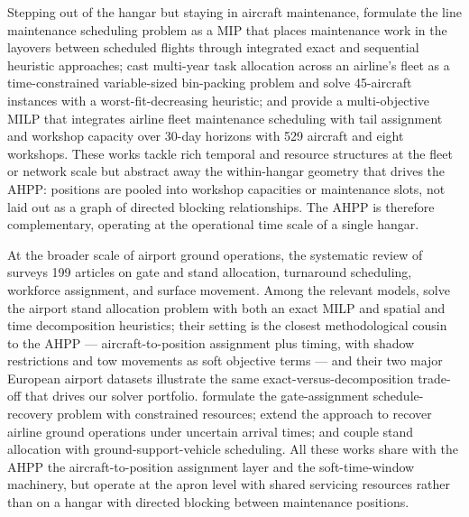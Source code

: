 Stepping out of the hangar but staying in aircraft maintenance,
\citet{Shaukat2020} formulate the line maintenance scheduling problem
as a MIP that places maintenance work in the layovers between scheduled
flights through integrated exact and sequential heuristic approaches;
\citet{Witteman2021} cast multi-year task allocation across an
airline's fleet as a time-constrained variable-sized bin-packing
problem and solve 45-aircraft instances with a worst-fit-decreasing
heuristic; and \citet{TorresSanchez2020} provide a multi-objective
MILP that integrates airline fleet maintenance scheduling with tail
assignment and workshop capacity over 30-day horizons with 529
aircraft and eight workshops.  These works tackle rich temporal and
resource structures at the fleet or network scale but abstract away
the within-hangar geometry that drives the AHPP: positions are pooled
into workshop capacities or maintenance slots, not laid out as a graph
of directed blocking relationships.  The AHPP is therefore
complementary, operating at the operational time scale of a single
hangar.

At the broader scale of airport ground operations, the systematic
review of \citet{Dahanayaka2026} surveys 199 articles on gate and stand
allocation, turnaround scheduling, workforce assignment, and surface
movement.  Among the relevant models, \citet{Guepet2015} solve the
airport stand allocation problem with both an exact MILP and spatial
and time decomposition heuristics; their setting is the closest
methodological cousin to the AHPP --- aircraft-to-position assignment
plus timing, with shadow restrictions and tow movements as soft
objective terms --- and their two major European airport datasets
illustrate the same exact-versus-decomposition trade-off that drives
our solver portfolio.  \citet{Asadi2021} formulate the gate-assignment
schedule-recovery problem with constrained resources;
\citet{Evler2021a, Evler2021b} extend the approach to recover airline
ground operations under uncertain arrival times; and \citet{Yao2024}
couple stand allocation with ground-support-vehicle scheduling.  All
these works share with the AHPP the aircraft-to-position assignment
layer and the soft-time-window machinery, but operate at the apron
level with shared servicing resources rather than on a hangar with
directed blocking between maintenance positions.

